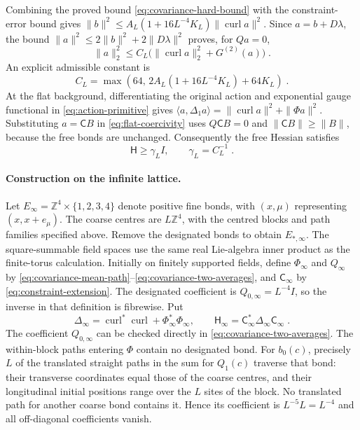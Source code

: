 \documentclass[11pt]{article}
\begin{document}
Combining the proved bound \eqref{eq:covariance-hard-bound} with the constraint-error bound gives $\|b\|^2\leq A_L(1+16L^{-4}K_L)\|\operatorname{curl}a\|^2$. Since $a=b+D\lambda$, the bound $\|a\|^2\leq 2\|b\|^2+2\|D\lambda\|^2$ proves, for $Qa=0$,
\begin{equation}\label{eq:flat-coercivity}
    \|a\|_2^2\leq C_L
        \bigl(\|\operatorname{curl}a\|_2^2+G^{(2)}(a)\bigr)\;.
\end{equation}
An explicit admissible constant is
\begin{equation}\label{eq:covariance-coercivity-constant}
    C_L=\max(64,\,2A_L(1+16L^{-4}K_L)+64K_L)\;.
\end{equation}
At the flat background, differentiating the original action and exponential gauge functional in \eqref{eq:action-primitive} gives $\langle a,\Delta_1a\rangle=\|\operatorname{curl}a\|^2+\|\Phi a\|^2$. Substituting $a=\mathsf C B$ in \eqref{eq:flat-coercivity} uses $Q\mathsf C B=0$ and $\|\mathsf C B\|\geq\|B\|$, because the free bonds are unchanged. Consequently the free Hessian satisfies
\begin{equation}\label{eq:covariance-uniform-gap}
    \mathsf H\geq\gamma_L I,
    \qquad \gamma_L=C_L^{-1}\;.
\end{equation}
\paragraph{Construction on the infinite lattice.}
Let $E_\infty=\mathbb Z^4\times\{1,2,3,4\}$ denote positive fine bonds, with $(x,\mu)$ representing $(x,x+e_\mu)$. The coarse centres are $L\mathbb Z^4$, with the centred blocks and path families specified above. Remove the designated bonds to obtain $E_{*,\infty}$. The square-summable field spaces use the same real Lie-algebra inner product as the finite-torus calculation. Initially on finitely supported fields, define $\Phi_\infty$ and $Q_\infty$ by \eqref{eq:covariance-mean-path}--\eqref{eq:covariance-two-averages}, and $\mathsf C_\infty$ by \eqref{eq:constraint-extension}. The designated coefficient is $Q_{0,\infty}=L^{-4}I$, so the inverse in that definition is fibrewise. Put
\begin{equation}\label{eq:bulk-operator-definition}
    \Delta_\infty=\operatorname{curl}^*\operatorname{curl}
        +\Phi_\infty^*\Phi_\infty,
    \qquad
    \mathsf H_\infty=\mathsf C_\infty^*\Delta_\infty\mathsf C_\infty\;.
\end{equation}
The coefficient $Q_{0,\infty}$ can be checked directly in \eqref{eq:covariance-two-averages}. The within-block paths entering $\Phi$ contain no designated bond. For $b_0(c)$, precisely $L$ of the translated straight paths in the sum for $Q_1(c)$ traverse that bond: their transverse coordinates equal those of the coarse centres, and their longitudinal initial positions range over the $L$ sites of the block. No translated path for another coarse bond contains it. Hence its coefficient is $L^{-5}L=L^{-4}$ and all off-diagonal coefficients vanish.
\end{document}
